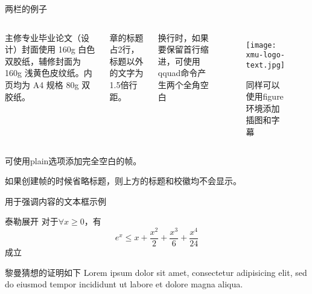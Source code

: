 \documentclass[aspectratio=169]{xmu-slide}
\begin{document}
\begin{frame}{两栏的例子}
    \begin{columns}
        \qquad 主修专业毕业论文（设计）封面使用 160g 白色双胶纸，辅修封面为 160g 浅黄色皮纹纸。内页均为 A4 规格 80g 双胶纸。\par
        章的标题占2行，标题以外的文字为1.5倍行距。\par
        \qquad 换行时，如果要保留首行缩进，可使用qquad命令产生两个全角空白\par
        \begin{figure}
            \texttt{[image: xmu-logo-text.jpg]}
            \caption{同样可以使用figure环境添加插图和字幕}
        \end{figure}
    \end{columns}
\end{frame}


\begin{frame}[plain]
    可使用plain选项添加完全空白的帧。\par
    如果创建帧的时候省略标题，则上方的标题和校徽均不会显示。
\end{frame}

\begin{frame}{用于强调内容的文本框示例}
    \begin{block}{泰勒展开}
        对于$\forall x\geq 0$，有
        $$
            e^x \leq x+\frac{x^2}{2}+\frac{x^3}{6}+\frac{x^4}{24}
        $$
        成立
    \end{block}
    \begin{block}{黎曼猜想的证明如下}
        Lorem ipsum dolor sit amet, consectetur adipisicing elit,
        sed do eiusmod tempor incididunt ut labore et
        dolore magna aliqua.
    \end{block}
\end{frame}

\end{document}
